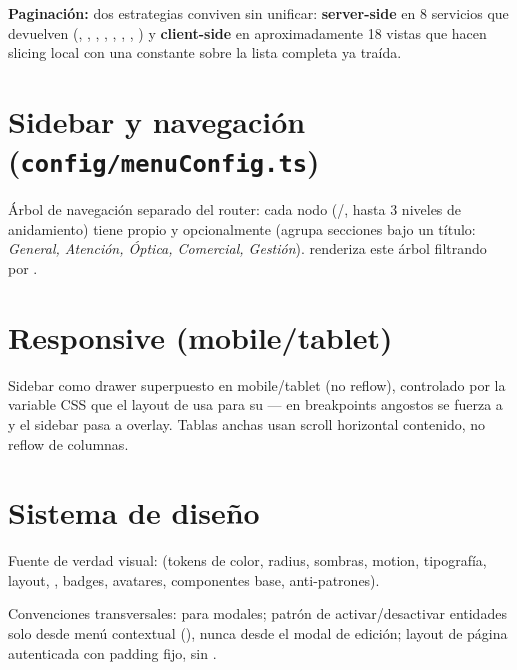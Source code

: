\textbf{Paginación:} dos estrategias conviven sin unificar: \textbf{server-side} en 8 servicios que devuelven  (, , , , , \allowbreak {}, , ) y \textbf{client-side} en aproximadamente 18 vistas que hacen slicing local con una constante  sobre la lista completa ya traída.

\section{Sidebar y navegación (\texttt{config/menuConfig.ts})}
\label{sec:frontend-sidebar}

Árbol de navegación separado del router: cada nodo (/, hasta 3 niveles de anidamiento) tiene  propio y opcionalmente  (agrupa secciones bajo un título: \textit{General, Atención, Óptica, Comercial, Gestión}).  renderiza este árbol filtrando por \allowbreak {}.

\section{Responsive (mobile/tablet)}
\label{sec:frontend-responsive}

Sidebar como drawer superpuesto en mobile/tablet (no reflow), controlado por la variable CSS  que el layout de  usa para su  --- en breakpoints angostos se fuerza a  y el sidebar pasa a overlay. Tablas anchas usan scroll horizontal contenido, no reflow de columnas.

\section{Sistema de diseño}
\label{sec:frontend-design-system}

Fuente de verdad visual:  (tokens de color, radius, sombras, motion, tipografía, layout, , badges, avatares, componentes base, anti-patrones).

Convenciones transversales:  para modales; patrón de activar/desactivar entidades solo desde menú contextual (), nunca desde el modal de edición; layout de página autenticada con padding  fijo, sin .
